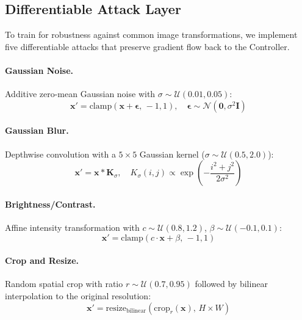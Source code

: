\documentclass[10pt, twocolumn]{article}
\newcommand{\Ncal}{\mathcal{N}}
\newcommand{\Ucal}{\mathcal{U}}
\begin{document}
\subsection{Differentiable Attack Layer}
\label{sec:attacks}

To train for robustness against common image transformations, we implement five differentiable attacks that preserve gradient flow back to the Controller.

\paragraph{Gaussian Noise.}
Additive zero-mean Gaussian noise with $\sigma \sim \Ucal(0.01, 0.05)$:
\begin{equation}
    \mathbf{x}' = \text{clamp}(\mathbf{x} + \bm{\epsilon},\, -1, 1), \quad \bm{\epsilon} \sim \Ncal(\mathbf{0}, \sigma^2 \mathbf{I})
\end{equation}

\paragraph{Gaussian Blur.}
Depthwise convolution with a $5\times5$ Gaussian kernel ($\sigma \sim \Ucal(0.5, 2.0)$):
\begin{equation}
    \mathbf{x}' = \mathbf{x} \ast \mathbf{K}_\sigma, \quad K_\sigma(i,j) \propto \exp\!\left(-\frac{i^2 + j^2}{2\sigma^2}\right)
\end{equation}

\paragraph{Brightness/Contrast.}
Affine intensity transformation with $c \sim \Ucal(0.8, 1.2)$, $\beta \sim \Ucal(-0.1, 0.1)$:
\begin{equation}
    \mathbf{x}' = \text{clamp}(c \cdot \mathbf{x} + \beta,\, -1, 1)
\end{equation}

\paragraph{Crop and Resize.}
Random spatial crop with ratio $r \sim \Ucal(0.7, 0.95)$ followed by bilinear interpolation to the original resolution:
\begin{equation}
    \mathbf{x}' = \text{resize}_\text{bilinear}(\text{crop}_r(\mathbf{x}),\, H \times W)
\end{equation}
\end{document}
